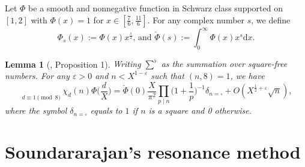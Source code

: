 \documentclass[12pt,reqno]{amsart}
\numberwithin{equation}{section}
\theoremstyle{plain}
\newtheorem{lemma}[theorem]{Lemma}
\theoremstyle{definition}
\theoremstyle{remark}
\newcommand{\dd}{\mathrm{d}}
\begin{document}
Let $\Phi$ be a smooth and nonnegative function in Schwarz class supported on $[1,2]$ with $\Phi(x)=1$ for $x\in [\frac{7}{6},\frac{11}{6}]$.
For any complex number $s$, we define
\begin{equation}\label{def:checkPhi}
  \Phi_s(x):=\Phi(x)x^\frac{s}{2}\textrm{, and }  \check\Phi(s):=\int_{0}^{\infty}\Phi(x)x^s\dd x.
\end{equation}


\begin{lemma}[\cite{RS15}, Proposition 1]\label{lemma:poission}
Writing $\sum\nolimits^\flat$ as the summation over square-free numbers.
For any $\varepsilon>0$ and
$n< X^{1-\varepsilon}$ such that $(n,8)=1$,
we have
  \begin{equation*}
   \mathop{\sum\nolimits^\flat}\limits_{d\equiv 1\pmod 8} \chi_d(n)\Phi\bigg(\frac{d}{X}\bigg)=
    \check{\Phi}(0)\frac{X}{\pi^2}\prod_{p\mid n}
    \bigg(1+\frac{1}{p}\bigg)^{-1}\delta_{n=\square}+
    O(X^{\frac{1}{2}+\varepsilon}\sqrt{n}),
  \end{equation*}
    where the symbol $\delta_{n=\square}$ equals to $1$ if $n$ is a square and 0 otherwise.
\end{lemma}


\section{Soundararajan's resonance method}\label{sec:proofoftheorem}
\end{document}

